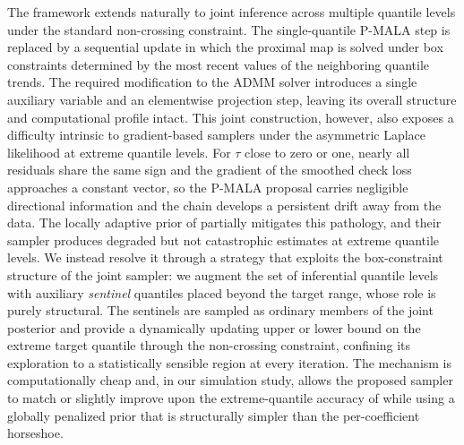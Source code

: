 The framework extends naturally to joint inference across multiple quantile levels under the standard non-crossing constraint. The single-quantile P-MALA step is replaced by a sequential update in which the proximal map is solved under box constraints determined by the most recent values of the neighboring quantile trends. The required modification to the ADMM solver introduces a single auxiliary variable and an elementwise projection step, leaving its overall structure and computational profile intact. This joint construction, however, also exposes a difficulty intrinsic to gradient-based samplers under the asymmetric Laplace likelihood at extreme quantile levels. For $\tau$ close to zero or one, nearly all residuals share the same sign and the gradient of the smoothed check loss approaches a constant vector, so the P-MALA proposal carries negligible directional information and the chain develops a persistent drift away from the data. The locally adaptive prior of \citet{onizuka2024fast} partially mitigates this pathology, and their sampler produces degraded but not catastrophic estimates at extreme quantile levels. We instead resolve it through a strategy that exploits the box-constraint structure of the joint sampler: we augment the set of inferential quantile levels with auxiliary \emph{sentinel} quantiles placed beyond the target range, whose role is purely structural. The sentinels are sampled as ordinary members of the joint posterior and provide a dynamically updating upper or lower bound on the extreme target quantile through the non-crossing constraint, confining its exploration to a statistically sensible region at every iteration. The mechanism is computationally cheap and, in our simulation study, allows the proposed sampler to match or slightly improve upon the extreme-quantile accuracy of \citet{onizuka2024fast} while using a globally penalized prior that is structurally simpler than the per-coefficient horseshoe.

